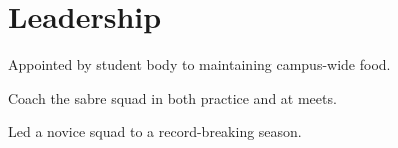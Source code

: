 \documentclass[letterpaper]{deedy-resume} %
\begin{document}
\begin{minipage}[t]{0.39\textwidth}
\section{Leadership}


\indent 

\begin{tightitemize}
	\item Appointed by student body to maintaining campus-wide food.
\end{tightitemize}

\sectionspace 



\begin{tightitemize}
	\item Coach the sabre squad in both practice and at meets.
	\item Led a novice squad to a record-breaking season.
\end{tightitemize}

\sectionspace






\end{minipage} %
\hfill
%
%
\end{document}
